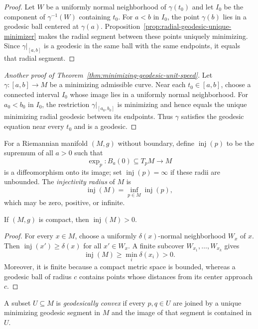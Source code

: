 \begin{proof}
\sketch Let $W$ be a uniformly normal neighborhood of $\gamma(t_0)$ and let
$I_0$ be the component of $\gamma^{-1}(W)$ containing $t_0$. For
$a<b$ in $I_0$, the point $\gamma(b)$ lies in a geodesic ball centered at
$\gamma(a)$. Proposition~\ref{prop:radial-geodesic-unique-minimizer} makes the
radial segment between these points uniquely minimizing. Since
$\gamma|_{[a,b]}$ is a geodesic in the same ball with the same endpoints, it
equals that radial segment.
\end{proof}

\begin{proof}[Another proof of Theorem~\ref{thm:minimizing-geodesic-unit-speed}]
\sketch Let $\gamma\colon[a,b]\to M$ be a minimizing admissible curve. Near
each $t_0\in[a,b]$, choose a connected interval $I_0$ whose image lies in a
uniformly normal neighborhood. For $a_0<b_0$ in $I_0$, the restriction
$\gamma|_{[a_0,b_0]}$ is minimizing and hence equals the unique minimizing
radial geodesic between its endpoints. Thus $\gamma$ satisfies the geodesic
equation near every $t_0$ and is a geodesic.
\end{proof}

For a Riemannian manifold $(M,g)$ without boundary, define
$\operatorname{inj}(p)$ to be the supremum of all $a>0$ such that
\[
\exp_p\colon B_a(0)\subseteq T_pM\longrightarrow M
\]
is a diffeomorphism onto its image; set $\operatorname{inj}(p)=\infty$ if
these radii are unbounded. The \emph{injectivity radius} of $M$ is
\[
\operatorname{inj}(M)=\inf_{p\in M}\operatorname{inj}(p),
\]
which may be zero, positive, or infinite.

\begin{lemma}
\label{lem:compact-injectivity-radius-positive}
If $(M,g)$ is compact, then $\operatorname{inj}(M)>0$.
\end{lemma}

\begin{proof}
\sketch For every $x\in M$, choose a uniformly $\delta(x)$-normal
neighborhood $W_x$ of $x$. Then
$\operatorname{inj}(x')\geq\delta(x)$ for all $x'\in W_x$. A finite subcover
$W_{x_1},\ldots,W_{x_k}$ gives
\[
\operatorname{inj}(M)\geq\min_i\delta(x_i)>0.
\]
Moreover, it is finite because a compact metric space is bounded, whereas a
geodesic ball of radius $c$ contains points whose distances from its center
approach $c$.
\end{proof}

A subset $U\subseteq M$ is \emph{geodesically convex} if every $p,q\in U$ are
joined by a unique minimizing geodesic segment in $M$ and the image of that
segment is contained in $U$.

